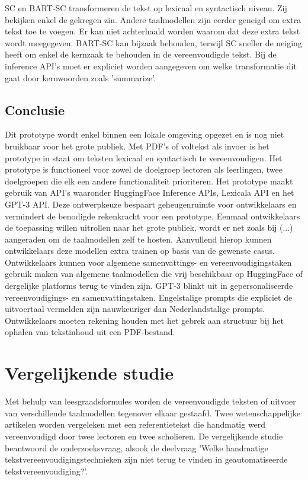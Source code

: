 SC en BART-SC transformeren de tekst op lexicaal en syntactisch niveau. Zij bekijken enkel de gekregen zin. Andere taalmodellen zijn eerder geneigd om extra tekst toe te voegen. Er kan niet achterhaald worden waarom dat deze extra tekst wordt meegegeven.
BART-SC kan bijzaak behouden, terwijl SC sneller de neiging heeft om enkel de kernzaak te behouden in de vereenvoudigde tekst. Bij de inference API's moet er expliciet worden aangegeven om welke transformatie dit gaat door kernwoorden zoals 'summarize'.

\section{Conclusie}

Dit prototype wordt enkel binnen een lokale omgeving opgezet en is nog niet bruikbaar voor het grote publiek. Met PDF's of voltekst als invoer is het prototype in staat om teksten lexicaal en syntactisch te vereenvoudigen. Het prototype is functioneel voor zowel de doelgroep lectoren als leerlingen, twee doelgroepen die elk een andere functionaliteit prioriteren. Het prototype maakt gebruik van API's waaronder HuggingFace Inference APIs, Lexicala API en het GPT-3 API. Deze ontwerpkeuze bespaart geheugenruimte voor ontwikkelaars en vermindert de benodigde rekenkracht voor een prototype. Eenmaal ontwikkelaars de toepassing willen uitrollen naar het grote publiek, wordt er net zoals bij (...) aangeraden om de taalmodellen zelf te hosten. Aanvullend hierop kunnen ontwikkelaars deze modellen extra trainen op basis van de gewenste casus. Ontwikkelaars kunnen voor algemene samenvattings- en vereenvoudigingstaken gebruik maken van algemene taalmodellen die vrij beschikbaar op HuggingFace of dergelijke platforms terug te vinden zijn. GPT-3 blinkt uit in gepersonaliseerde vereenvoudigings- en samenvattingstaken. Engelstalige prompts die expliciet de uitvoertaal vermelden zijn nauwkeuriger dan Nederlandstalige prompts. Ontwikkelaars moeten rekening houden met het gebrek aan structuur bij het ophalen van tekstinhoud uit een PDF-bestand.

\chapter{Vergelijkende studie}

Met behulp van leesgraadsformules worden de vereenvoudigde teksten of uitvoer van verschillende taalmodellen tegenover elkaar gestaafd. Twee wetenschappelijke artikelen worden vergeleken met een referentietekst die handmatig werd vereenvoudigd door twee lectoren en twee scholieren. De vergelijkende studie beantwoord de onderzoeksvraag, alsook de deelvraag 'Welke handmatige tekstvereenvoudigingstechnieken zijn niet terug te vinden in geautomatiseerde tekstvereenvoudiging?'.

